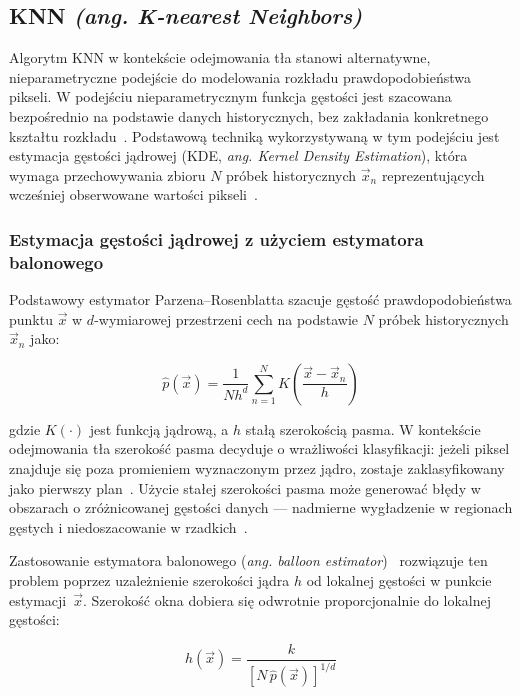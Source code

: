 \subsection{KNN \textit{(ang. K-nearest Neighbors)}}

Algorytm KNN w kontekście odejmowania tła stanowi alternatywne, nieparametryczne podejście do
modelowania rozkładu prawdopodobieństwa pikseli. W podejściu nieparametrycznym funkcja gęstości
jest szacowana bezpośrednio na podstawie danych historycznych, bez zakładania konkretnego kształtu
rozkładu~\cite{elgammal2000}. Podstawową techniką wykorzystywaną w tym podejściu jest estymacja
gęstości jądrowej (KDE, \textit{ang. Kernel Density Estimation}), która wymaga przechowywania
zbioru $N$ próbek historycznych $\vec{x}_n$ reprezentujących wcześniej obserwowane wartości
pikseli~\cite{elgammal2000}.

\subsubsection{Estymacja gęstości jądrowej z użyciem estymatora balonowego}

Podstawowy estymator Parzena–Rosenblatta szacuje gęstość prawdopodobieństwa punktu $\vec{x}$ w
$d$-wymiarowej przestrzeni cech na podstawie $N$ próbek historycznych $\vec{x}_n$ jako:

\begin{equation}
  \hat{p}(\vec{x}) = \frac{1}{N h^d} \sum_{n=1}^{N} K\!\left(\frac{\vec{x} - \vec{x}_n}{h}\right)
\end{equation}

gdzie $K(\cdot)$ jest funkcją jądrową, a $h$ stałą szerokością pasma. W kontekście odejmowania tła
szerokość pasma decyduje o wrażliwości klasyfikacji: jeżeli piksel znajduje się poza promieniem
wyznaczonym przez jądro, zostaje zaklasyfikowany jako pierwszy plan~\cite{zivkovic2006}. Użycie
stałej szerokości pasma może generować błędy w obszarach o zróżnicowanej gęstości danych —
nadmierne wygładzenie w regionach gęstych i niedoszacowanie w rzadkich~\cite{terrell1992}.

Zastosowanie estymatora balonowego (\textit{ang. balloon estimator})~\cite{terrell1992} rozwiązuje
ten problem poprzez uzależnienie szerokości jądra $h$ od lokalnej gęstości w punkcie
estymacji~$\vec{x}$. Szerokość okna dobiera się odwrotnie proporcjonalnie do lokalnej gęstości:

\begin{equation}
  h(\vec{x}) = \frac{k}{\left[N\,\hat{p}(\vec{x})\right]^{1/d}}
\end{equation}

